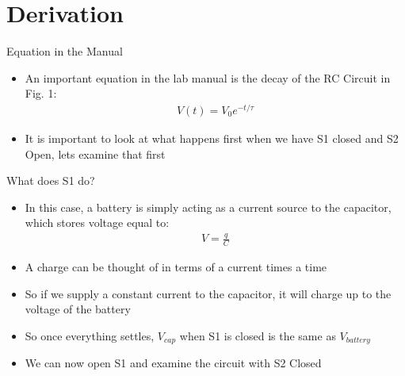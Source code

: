 \documentclass{beamer}
\begin{document}
\section{Derivation}
\begin{frame}{Equation in the Manual}
  \begin{itemize}
  \item An important equation in the lab manual is the decay of the RC Circuit in Fig. 1:
    \begin{align*}
      V(t)=V_0 e^{-t/\tau}
    \end{align*}
  \item It is important to look at what happens first when we have S1 closed and S2 Open, lets examine that first
  \end{itemize}
\end{frame}
\begin{frame}{What does S1 do?}
  \begin{itemize}
  \item In this case, a battery is simply acting as a current source to the capacitor, which stores voltage equal to:
    \begin{align*}
      V=\frac{q}{C}
    \end{align*}
  \item A charge can be thought of in terms of a current times a time
  \item So if we supply a constant current to the capacitor, it will charge up to the voltage of the battery
  \item So once everything settles, $V_{cap}$ when S1 is closed is the same as $V_{battery}$
  \item We can now open S1 and examine the circuit with S2 Closed
  \end{itemize}
\end{frame}
\end{document}
